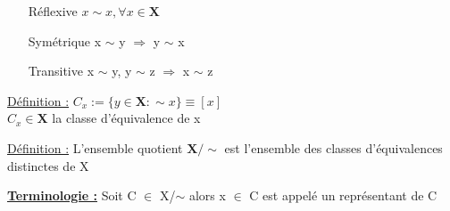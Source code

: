 \documentclass[12pt,a4paper]{article}
\newcommand{\evid}[1]{\textbf{\underline{#1}}}
\begin{document}
\begin{itemize}
\item[Réflexive] $x \sim x, \forall x \in \mathbf{X}$
\item[Symétrique] x $\sim$ y $\Rightarrow$ y $\sim$ x
\item[Transitive] x $\sim$ y, y $\sim$ z $\Rightarrow$ x $\sim$ z
\end{itemize}
\begin{boite}
\underline{Définition :} $C_x := \{y \in \mathbf{X} : \sim x\} \equiv [x]$\\
$C_x \in \mathbf{X}$ la classe d'équivalence de x
\end{boite}

\begin{boite}
\underline{Définition :} L'ensemble quotient $\mathbf{X}/ \sim$ est l'ensemble des classes d'équivalences distinctes de X
\end{boite}
\evid{Terminologie :} Soit C $\in$ X/$\sim$ alors x $\in$ C est appelé un représentant de C
\end{document}
